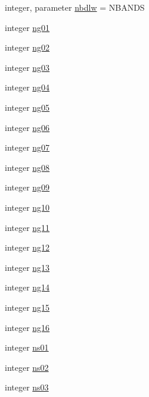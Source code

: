 \begin{DoxyCompactItemize}
integer, parameter \hyperlink{group__module__radlw__main_ga39a115a97296886b2e6e37b220e942c7}{nbdlw} = N\+B\+A\+N\+DS
\item 
integer \hyperlink{group__module__radlw__main_ga54dc7913677d754af2b7ece9732b1280}{ng01}
\item 
integer \hyperlink{group__module__radlw__main_gaed66d66a4da744d27c13b57b41ba78c3}{ng02}
\item 
integer \hyperlink{group__module__radlw__main_gad226d9951e041e991f463a9a90e7f68b}{ng03}
\item 
integer \hyperlink{group__module__radlw__main_gafd05a94bc29e5a5d792c0c140fe3a0c4}{ng04}
\item 
integer \hyperlink{group__module__radlw__main_ga1e70690afc3ba2cca4344d6df3d26ee8}{ng05}
\item 
integer \hyperlink{group__module__radlw__main_ga9a176786a0df1e65165db9b3c6f0e582}{ng06}
\item 
integer \hyperlink{group__module__radlw__main_gab8f22f9ceabf3946452055c461476d49}{ng07}
\item 
integer \hyperlink{group__module__radlw__main_ga61aba0726187e15acf8bae5c377dbdd5}{ng08}
\item 
integer \hyperlink{group__module__radlw__main_ga2856b7576a44f2e35bd0fbc1e49bd270}{ng09}
\item 
integer \hyperlink{group__module__radlw__main_gaa764831e931a2ec27c763ebf957bbc67}{ng10}
\item 
integer \hyperlink{group__module__radlw__main_ga239b6c64459896a583e88c8ba2324348}{ng11}
\item 
integer \hyperlink{group__module__radlw__main_ga88f3b780d4dc9d4e45852fd41e111a21}{ng12}
\item 
integer \hyperlink{group__module__radlw__main_ga30e06652ca51875c17e56138eade5add}{ng13}
\item 
integer \hyperlink{group__module__radlw__main_ga32a603592af43d9de953c983a4e2f8c8}{ng14}
\item 
integer \hyperlink{group__module__radlw__main_ga1401bb43dbe665c21a17276cd82f4859}{ng15}
\item 
integer \hyperlink{group__module__radlw__main_gaf6c5d2407ab29bb09fd2c297d4524e74}{ng16}
\item 
integer \hyperlink{group__module__radlw__main_ga0f82508bbb4039ebbc3fcb68e8e4e699}{ns01}
\item 
integer \hyperlink{group__module__radlw__main_ga8b13d877f08e7c26333285fd1db19d4e}{ns02}
\item 
integer \hyperlink{group__module__radlw__main_ga987d257f8e2f0743e92055be94424401}{ns03}

\end{DoxyCompactItemize}
